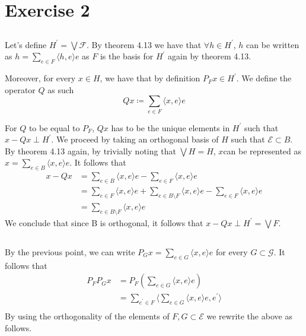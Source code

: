 \documentclass[a4paper,12pt]{article} %
\begin{document}
\section{Exercise 2}
\subsection{}
Let's define \(H^{\prime}  = \bigvee \mathcal{F}\). By theorem 4.13 we have that \(\forall h \in  H^{\prime} \), \(h\) can be written as \(h = \sum_{e \in  F} \langle h,e \rangle e  \) as \(F\) is the basis for \(H^{\prime} \) again by theorem 4.13.

Moreover, for every \(x \in H\), we have that by definition \(P_F x \in  H^{\prime} \).
We define the operator \(Q\) as such
\begin{equation}
    Qx \coloneqq \sum_{e \in  F}\langle x,e \rangle e
\end{equation}

For \(Q\) to be equal to \(P_F\), \(Qx \) has to be the unique elements in \(H^{\prime} \) such that \(x - Qx \perp H^{\prime} \).
We proceed by taking an orthogonal basis of \(H\) such that \(\mathcal{E} \subset B\).
By theorem 4.13 again, by trivially noting that \(\bigvee H = H\), \(x\)can be represented as \(x=\sum_{e\in B}\langle x,e \rangle e  \).
It follows that
\begin{align*}
    x-Qx & = \sum_{e \in  B}\langle x,e \rangle e - \sum_{e \in  F}\langle x,e \rangle e                                                   \\
         & =  \sum_{e \in F}\langle x,e \rangle e+ \sum_{e \in  B\setminus F}\langle x,e \rangle e  - \sum_{e \in  F}\langle x,e \rangle e \\
         & = \sum_{e \in  B\setminus F}\langle x,e \rangle e
\end{align*}
We conclude that since B is orthogonal, it follows that \(x-Qx \perp H^{\prime} = \bigvee F\).


\subsection{}
By the previous point, we can write \(P_G x = \sum_{e \in  G}\langle x,e \rangle e \) for every \(G \subset \mathcal{G}\).
It follows that
\begin{align*}
    P_F P_G x & = P_F \left( \sum_{e \in  G}\langle x,e \rangle e  \right)
    \\
              & =\sum_{e^{\prime}  \in F} \langle \sum_{e \in  G}\langle x,e \rangle e   ,e^{\prime} \rangle \\
\end{align*}
By using the orthogonality of the elements of \(F,G \subset \mathcal{E}\) we rewrite the above as follows.
\end{document}
